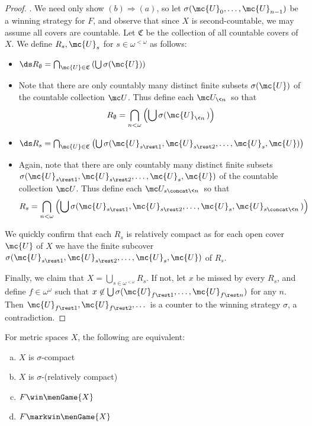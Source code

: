   \begin{proof}.
    We need only show $(b)\Rightarrow(a)$, so let $\sigma(\mc{U}_0,\dots,\mc{U}_{n-1})$ be a winning strategy for $F$, and observe that since $X$ is second-countable, we may assume all covers are countable. Let $\mathfrak{C}$ be the collection of all countable covers of $X$. We define $R_s,\mc{U}_s$ for $s\in\omega^{<\omega}$ as follows:
      \begin{itemize}
        \item $\ds R_\emptyset = \bigcap_{\mc{U}\in\mathfrak{C}} \left(\bigcup \sigma(\mc{U})\right)$
        \item Note that there are only countably many distinct finite subsets $\sigma(\mc{U})$ of the countable collection $\mc U$. Thus define each $\mc U_{\<n\>}$ so that
          \[
            R_\emptyset =
            \bigcap_{n<\omega}\left(\bigcup\sigma(\mc{U}_{\<n\>})\right)
          \]
        \item $\ds R_s = \bigcap_{\mc{U}\in\mathfrak{C}} \left(\bigcup \sigma(\mc{U}_{s\rest1},\mc{U}_{s\rest2},\dots,\mc{U}_s,\mc{U})\right)$
        \item Again, note that there are only countably many distinct finite subsets $\sigma(\mc{U}_{s\rest1},\mc{U}_{s\rest2},\dots,\mc{U}_s,\mc{U})$ of the countable collection $\mc U$. Thus define each $\mc U_{s\concat\<n\>}$ so that
          \[
            R_s =
            \bigcap_{n<\omega} \left(\bigcup \sigma(\mc{U}_{s\rest1},\mc{U}_{s\rest2},\dots,\mc{U}_s,\mc{U}_{s\concat\<n\>})\right)
          \]
      \end{itemize}

    We quickly confirm that each $R_s$ is relatively compact as for each open cover $\mc{U}$ of $X$ we have the finite subcover $\sigma(\mc{U}_{s\rest1},\mc{U}_{s\rest2},\dots,\mc{U}_s,\mc{U})$ of $R_s$.

    Finally, we claim that $X = \bigcup_{s\in\omega^{<\omega}} R_s$. If not, let $x$ be missed by every $R_s$, and define $f\in\omega^\omega$ such that $x\not\in \bigcup\sigma(\mc{U}_{f\rest1},\dots,\mc{U}_{f\rest n})$ for any $n$. Then $\mc{U}_{f\rest1},\mc{U}_{f\rest2},\dots$ is a counter to the winning strategy $\sigma$, a contradiction.
  \end{proof}

  \begin{cor}
    For metric spaces $X$, the following are equivalent:
      \begin{enumerate}[(a)]
        \item $X$ is $\sigma$-compact
        \item $X$ is $\sigma$-(relatively compact)
        \item $F \win \menGame{X}$
        \item $F \markwin \menGame{X}$
      \end{enumerate}
  \end{cor}

